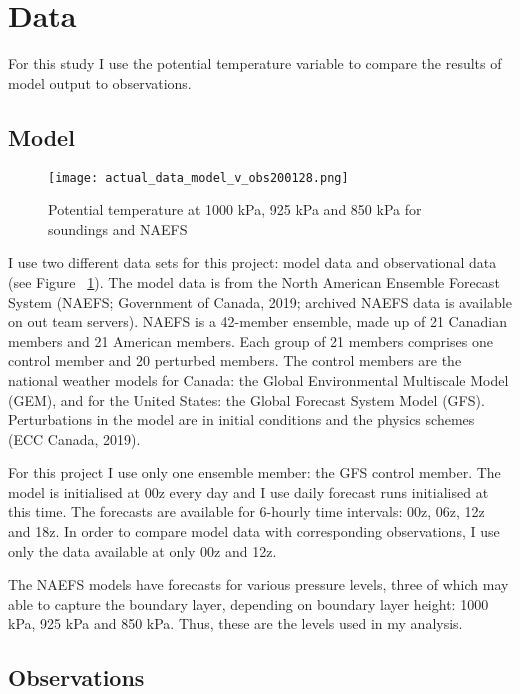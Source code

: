 \documentclass[12pt]{article}
\begin{document}
\section{Data}

For this study I use the potential temperature variable to compare the 
results of model output to observations. 

\subsection{Model}

\begin{figure}[h]
    \centering
    \texttt{[image: actual\_data\_model\_v\_obs200128.png]}
    \caption{Potential temperature at 1000 kPa, 925 kPa and 850 kPa for soundings and NAEFS}
    \label{fig:alldata}
\end{figure}


I use two different data sets for this project: model data and observational data (see Figure ~\ref{fig:alldata}). 
The model data is from the North American Ensemble Forecast System (NAEFS; Government of Canada, 2019; 
archived NAEFS data is available on out team servers). NAEFS is a 42-member ensemble, made up 
of 21 Canadian members and 21 American members. Each group of 21 members comprises one control 
member and 20 perturbed members. The control members are the national weather models for Canada: 
the Global Environmental Multiscale Model (GEM), and for the United States: the Global Forecast 
System Model (GFS). Perturbations in the model are in initial conditions and the physics schemes 
(ECC Canada, 2019). 

For this project I use only one ensemble member: the GFS control member. The model is initialised 
at 00z every day and I use daily forecast runs initialised at this time. The forecasts are 
available for 6-hourly time intervals: 00z, 06z, 12z and 18z. In order to compare model data 
with corresponding observations, I use only the data available at only 00z and 12z. 

The NAEFS models have forecasts for various pressure levels, three of which may able to capture 
the boundary layer, depending on boundary layer height: 1000 kPa, 925 kPa and 850 kPa. Thus, 
these are the levels used in my analysis.


\subsection{Observations}
\end{document}

